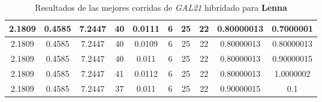 \begin{table}[h!]
\begin{center}
\begin{tabular}{|c|c|c|c|c|c|c|c|c|c|}
        \hline
        \hline
            2.1809 & 0.4585  & 7.2447 & 40 & 0.0111 & 6 & 25 & 22 & 0.80000013 & 0.7000001\\
        \hline
        \hline
            2.1809 & 0.4585  & 7.2447 & 40 & 0.0109 & 6 & 25 & 22 & 0.80000013 & 0.80000013\\
        \hline
        \hline
            2.1809 & 0.4585  & 7.2447 & 40 & 0.011 & 6 & 25 & 22 & 0.80000013 & 0.90000015\\
        \hline
        \hline
            2.1809 & 0.4585  & 7.2447 & 41 & 0.0112 & 6 & 25 & 22 & 0.80000013 & 1.0000002\\
        \hline
        \hline
            2.1809 & 0.4585  & 7.2447 & 37 & 0.011 & 6 & 25 & 22 & 0.90000015 & 0.1\\
        \hline
        \end{tabular}
        \caption{Resultados de las mejores corridas de \emph{GAL21} hibridado para {\bf Lenna}}
        \label{tb:tableGAL21}
    \end{center}
\end{table}
